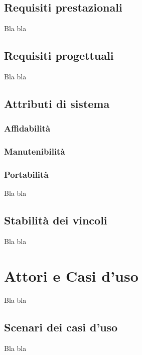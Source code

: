 \subsection{Requisiti prestazionali}

Bla bla

\subsection{Requisiti progettuali}

Bla bla

\subsection{Attributi di sistema}

\subsubsection{Affidabilità}

\subsubsection{Manutenibilità}

\subsubsection{Portabilità}

Bla bla

\subsection{Stabilità dei vincoli}

Bla bla

\section{Attori e Casi d'uso}

Bla bla

\subsection{Scenari dei casi d'uso}

Bla bla